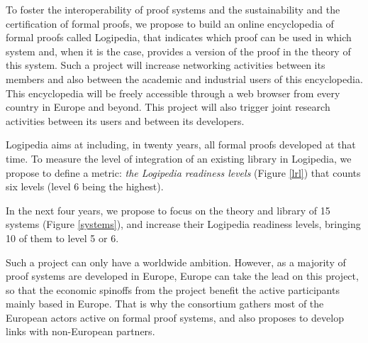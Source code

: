 To foster the interoperability of proof systems and the sustainability
and the certification of formal proofs, we propose to build an online
encyclopedia of formal proofs called {\sc Logipedia}, that indicates
which proof can be used in which system and, when it is the case,
provides a version of the proof in the theory of this system.  Such a
project will increase networking activities between its members and
also between the academic and industrial users of this encyclopedia.
This encyclopedia will be freely accessible through a web browser from
every country in Europe and beyond. This project will also trigger
joint research activities between its users and between its
developers.

{\sc Logipedia} aims at including, in twenty years, all formal proofs
developed at that time. To measure the level of integration of an
existing library in {\sc Logipedia}, we propose to define a metric:
{\em the {\sc Logipedia} readiness levels} (Figure \ref{lrl}) that
counts six levels (level 6 being the highest).

In the next four years, we propose to focus on the theory and library
of 15 systems (Figure \ref{systems}), and increase their {\sc
  Logipedia} readiness levels, bringing 10 of them to level 5 or 6.

Such a project can only have a worldwide ambition. However, as a
majority of proof systems are developed in Europe, Europe can take the
lead on this project, so that the economic spinoffs from the project
benefit the active participants mainly based in Europe.  That is why
the consortium gathers most of the European actors active on formal
proof systems, and also proposes to develop links with non-European
partners.


